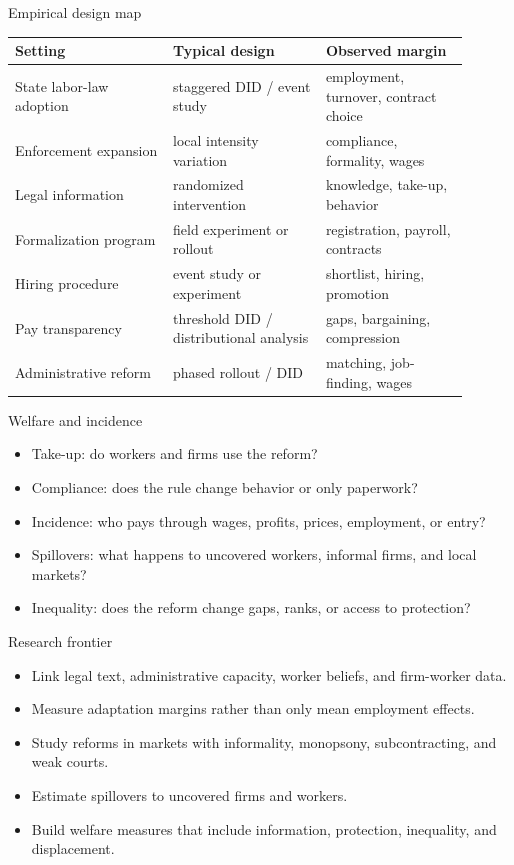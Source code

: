 \documentclass[aspectratio=169,11pt]{beamer}
\begin{document}
\begin{frame}{Empirical design map}
\small
\begin{tabular}{p{0.31\linewidth} p{0.30\linewidth} p{0.29\linewidth}}
\toprule
Setting & Typical design & Observed margin \\
\midrule
State labor-law adoption & staggered DID / event study & employment, turnover, contract choice \\
Enforcement expansion & local intensity variation & compliance, formality, wages \\
Legal information & randomized intervention & knowledge, take-up, behavior \\
Formalization program & field experiment or rollout & registration, payroll, contracts \\
Hiring procedure & event study or experiment & shortlist, hiring, promotion \\
Pay transparency & threshold DID / distributional analysis & gaps, bargaining, compression \\
Administrative reform & phased rollout / DID & matching, job-finding, wages \\
\bottomrule
\end{tabular}
\end{frame}

\begin{frame}{Welfare and incidence}
\begin{itemize}
    \item Take-up: do workers and firms use the reform?
    \item Compliance: does the rule change behavior or only paperwork?
    \item Incidence: who pays through wages, profits, prices, employment, or entry?
    \item Spillovers: what happens to uncovered workers, informal firms, and local markets?
    \item Inequality: does the reform change gaps, ranks, or access to protection?
\end{itemize}
\end{frame}

\begin{frame}{Research frontier}
\begin{itemize}
    \item Link legal text, administrative capacity, worker beliefs, and firm-worker data.
    \item Measure adaptation margins rather than only mean employment effects.
    \item Study reforms in markets with informality, monopsony, subcontracting, and weak courts.
    \item Estimate spillovers to uncovered firms and workers.
    \item Build welfare measures that include information, protection, inequality, and displacement.
\end{itemize}
\end{frame}
\end{document}
